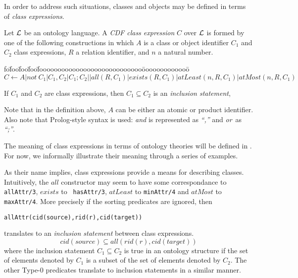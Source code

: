 In order to address such situations, classes and objects may be
defined in terms of {\em class expressions}.

\begin{definition} \label{def:ce} 
Let ${\cal L}$ be an ontology language.  A {\em CDF class expression} $C$
over ${\cal L}$ is formed by one of the following constructions in which
$A$ is a class or object identifier $C_1$ and $C_2$ class expressions,
$R$ a relation identifier, and $n$ a natural number.
\begin{tabbing}
fo\=foo\=foo\=foo\=foooooooooooooooooooooooooooo\=ooooooooooooo\=\kill
\> $C \leftarrow A | not\ C_1 | C_1 , C_2 | C_1 ; C_2 |
			| all(R,C_1) | exists(R,C_1)
 			  | atLeast(n,R,C_1) | atMost(n,R,C_1)  $ 
\end{tabbing}
If $C_1$ and $C_2$ are class expressions, then $C_1 \subseteq C_2$ is
an {\em inclusion statement},  
\end{definition}
Note that in the definition above, $A$ can be either an atomic or
product identifier. Also note that Prolog-style syntax is used: {\em
and} is represented as {\em ``,''} and {\em or}\  as {\em ``;''}.  

The meaning of class expressions in terms of ontology theories will be
defined in .  For now, we informally
illustrate their meaning through a series of examples.

As their name implies, class expressions provide a means for
describing classes.  Intuitively, the $all$ constructor may seem to
have some correspondance to {\tt allAttr/3}, $exists$ to {\tt
hasAttr/3}, $atLeast$ to {\tt minAttr/4} and $atMost$ to {\tt
maxAttr/4}.  More precisely if the sorting predicates are ignored,
then
\begin{center}
{\tt allAttr(cid(source),rid(r),cid(target))} 
\end{center}
\noindent
translates to an {\em inclusion statement} 
 between class expressions.
\[ 
cid(source) \subseteq all(rid(r),cid(target))
\]
where the inclusion statement $C_1 \subseteq C_2$ is true in an
ontology structure if the set of elements denoted by $C_1$ is a subset
of the set of elements denoted by $C_2$.  The other Type-0 predicates
translate to inclusion statements in a similar manner.


